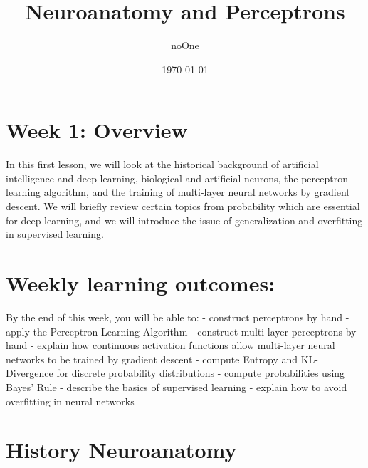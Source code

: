 \documentclass[11pt]{article}
\title{Neuroanatomy and Perceptrons}
\author{noOne}
\date{\today}
\begin{document}
\maketitle
\section{Week 1: Overview}\label{sec:week-1:-overview}
In this first lesson, we will look at the historical background of artificial intelligence and deep learning, biological and artificial neurons, the perceptron learning algorithm, and the training of multi-layer neural networks by gradient descent.
We will briefly review certain topics from probability which are essential for deep learning, and we will introduce the issue of generalization and overfitting in supervised learning.

\section{Weekly learning outcomes:}\label{sec:weekly-learning-outcomes:}
By the end of this week, you will be able to:
- construct perceptrons by hand
- apply the Perceptron Learning Algorithm
- construct multi-layer perceptrons by hand
- explain how continuous activation functions allow multi-layer neural networks
to be trained by gradient descent
- compute Entropy and KL-Divergence for discrete probability distributions
- compute probabilities using Bayes’ Rule
- describe the basics of supervised learning
- explain how to avoid overfitting in neural networks

\section{History Neuroanatomy}\label{sec:history--neuroanatomy}
\end{document}
